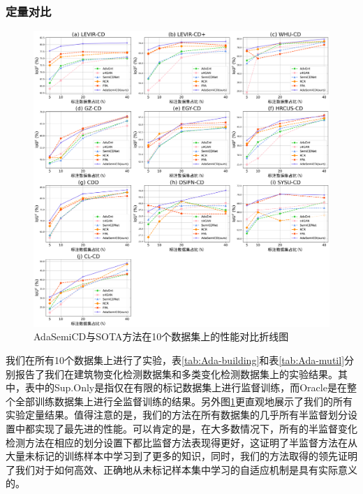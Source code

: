 \documentclass[lang=chs, degree=master, blindreview=false, adobe=false]{yanputhesis}
\begin{document}
\subsubsection{定量对比}
\begin{figure}[H]
  \centering
  \includegraphics[scale=0.30]{images/Adavis_plot.png}
  \caption{
    AdaSemiCD与SOTA方法在10个数据集上的性能对比折线图
  }
  \label{fig:Adaiou_plot}
\end{figure}
我们在所有10个数据集上进行了实验，表\ref{tab:Ada-building}和表\ref{tab:Ada-mutil}分别报告了我们在建筑物变化检测数据集和多类变化检测数据集上的实验结果。其中，表中的Sup.Only是指仅在有限的标记数据集上进行监督训练，而Oracle是在整个全部训练数据集上进行全监督训练的结果。另外图\ref{fig:Adaiou_plot}更直观地展示了我们的所有实验定量结果。值得注意的是，我们的方法在所有数据集的几乎所有半监督划分设置中都实现了最先进的性能。可以肯定的是，在大多数情况下，所有的半监督变化检测方法在相应的划分设置下都比监督方法表现得更好，这证明了半监督方法在从大量未标记的训练样本中学习到了更多的知识，同时，我们的方法取得的领先证明了我们对于如何高效、正确地从未标记样本集中学习的自适应机制是具有实际意义的。
\end{document}
